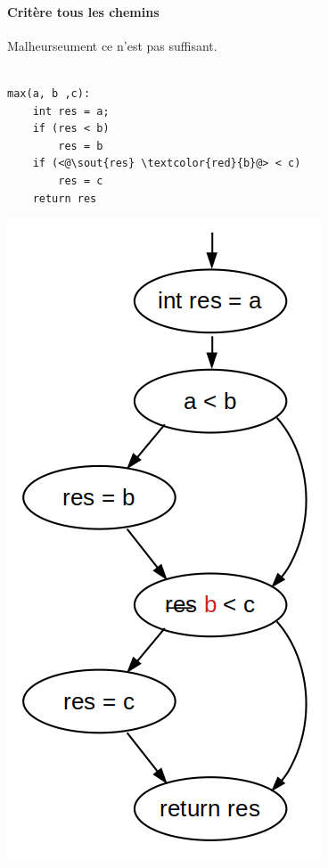 \paragraph{Critère tous les chemins} Malheurseument ce n'est pas suffisant.
\\ \\
\begin{minipage}{0.5\linewidth}
\begin{lstlisting}
max(a, b ,c):
    int res = a;
    if (res < b)
        res = b
    if (<@\sout{res} \textcolor{red}{b}@> < c)
        res = c
    return res
\end{lstlisting}
\end{minipage}
\begin{minipage}{0.5\linewidth}
\begin{center}
	\includegraphics[scale=0.3]{Developpements/critere de test/cas_31.png}
\end{center}
\end{minipage}
